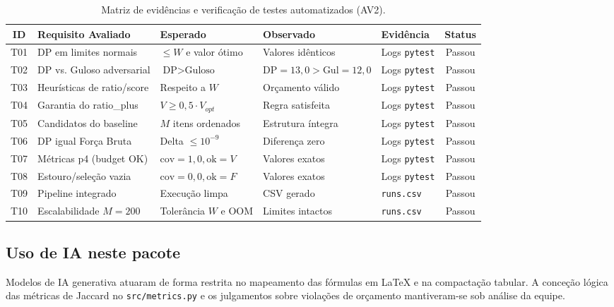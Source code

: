 \begin{table}[H]
\centering
\footnotesize
\caption{Matriz de evidências e verificação de testes automatizados (AV2).}
\label{tab:testes_av2}
\begin{tabular}{cp{3.3cm}p{2.3cm}p{2.3cm}p{2.3cm}c}
\hline
\textbf{ID} & \textbf{Requisito Avaliado} & \textbf{Esperado} & \textbf{Observado} & \textbf{Evidência} & \textbf{Status} \\
\hline
T01 & DP em limites normais & $\le W$ e valor ótimo & Valores idênticos & Logs \texttt{pytest} & Passou \\
T02 & DP vs. Guloso adversarial & $\text{DP} > \text{Guloso}$ & $\text{DP}=13{,}0 > \text{Gul}=12{,}0$ & Logs \texttt{pytest} & Passou \\
T03 & Heurísticas de ratio/score& Respeito a $W$ & Orçamento válido & Logs \texttt{pytest} & Passou \\
T04 & Garantia do ratio\_plus & $V \ge 0{,}5 \cdot V_{opt}$ & Regra satisfeita & Logs \texttt{pytest} & Passou \\
T05 & Candidatos do baseline & $M$ itens ordenados & Estrutura íntegra & Logs \texttt{pytest} & Passou \\
T06 & DP igual Força Bruta & Delta $\le 10^{-9}$ & Diferença zero & Logs \texttt{pytest} & Passou \\
T07 & Métricas p4 (budget OK) & $\text{cov}=1{,}0, \text{ok}=V$ & Valores exatos & Logs \texttt{pytest} & Passou \\
T08 & Estouro/seleção vazia & $\text{cov}=0{,}0, \text{ok}=F$ & Valores exatos & Logs \texttt{pytest} & Passou \\
T09 & Pipeline integrado & Execução limpa & CSV gerado & \texttt{runs.csv} & Passou \\
T10 & Escalabilidade $M=200$ & Tolerância $W$ e OOM & Limites intactos & \texttt{runs.csv} & Passou \\
\hline
\end{tabular}
\end{table}

\subsection{Uso de IA neste pacote}
Modelos de IA generativa atuaram de forma restrita no mapeamento das fórmulas em \LaTeX{} e na compactação tabular. A conceção lógica das métricas de Jaccard no \texttt{src/metrics.py} e os julgamentos sobre violações de orçamento mantiveram-se sob análise da equipe.